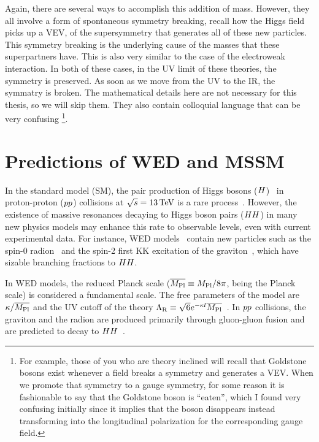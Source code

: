 Again, there are several ways to accomplish this addition of mass. 
However, they all involve a form of spontaneous symmetry breaking, recall how the Higgs field picks up a VEV, of the supersymmetry that generates all of these new particles.
This symmetry breaking is the underlying cause of the masses that these superpartners have. This is also very similar to the case of the electroweak interaction. 
In both of these cases, in the UV limit of these theories, the symmetry is preserved. As soon as we move from the UV to the IR, the symmatry is broken. 
The mathematical details here are not necessary for this thesis, so we will skip them. They also contain colloquial language that can be very confusing \footnote{For example, those of you who are theory inclined will recall that Goldstone bosons exist whenever a field breaks a symmetry and generates a VEV. When we promote that symmetry to a gauge symmetry, for some reason it is fashionable to say that the Goldstone boson is ``eaten'', which I found very confusing initially since it implies that the boson disappears instead transforming into the longitudinal polarization for the corresponding gauge field.}. 

\section{Predictions of WED and MSSM}
In the standard model (SM), the pair production of Higgs bosons ($H$)~\cite{HiggsDiscoveryAtlas,HiggsDiscoveryCMS,CMSHiggsLongPaper} in proton-proton ($pp$) collisions at $\sqrt{s} = 13\,\text{Te\hspace{-.08em}V}$ is a rare process~\cite{deFlorian:2013jea}.
However, the existence of massive resonances decaying to Higgs boson pairs ($HH$) in many new physics models may enhance this rate to observable levels, even with current experimental data.
For instance, WED models~\cite{Randall:1999ee} contain new particles such as the spin-0 radion~\cite{Goldberger:1999uk,Csaki:1999mp,Csaki:2000zn} and the spin-2 first KK excitation of the graviton~\cite{Davoudiasl:1999jd,DeWolfe:1999cp, Agashe:2007zd}, which have sizable branching fractions to $HH$.

In WED models, the reduced Planck scale ($\overline{{M_\mathrm{Pl}}} \equiv {M_\mathrm{Pl}}/8\pi$, \Mpl being the Planck scale) is considered a fundamental scale.
The free parameters of the model are $\kappa / \overline{{M_\mathrm{Pl}}}$ and the UV cutoff of the theory $\Lambda_{\textrm R} \equiv \sqrt{6} e^{-\kappa l} \overline{{M_\mathrm{Pl}}}$~\cite{Goldberger:1999uk}.
In $pp$ collisions, the graviton and the radion are produced primarily through gluon-gluon fusion and are predicted to decay to $HH$~\cite{Oliveira:2014kla}.

